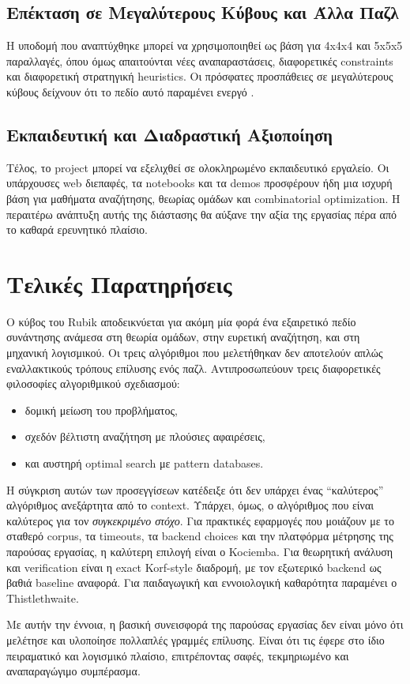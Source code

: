 \subsection{Επέκταση σε Μεγαλύτερους Κύβους και Άλλα Παζλ}

Η υποδομή που αναπτύχθηκε μπορεί να χρησιμοποιηθεί ως βάση για 4x4x4 και 5x5x5 παραλλαγές, όπου όμως απαιτούνται νέες αναπαραστάσεις, διαφορετικές constraints και διαφορετική στρατηγική heuristics. Οι πρόσφατες προσπάθειες σε μεγαλύτερους κύβους δείχνουν ότι το πεδίο αυτό παραμένει ενεργό \cite{khoruzhii2025ml}.

\subsection{Εκπαιδευτική και Διαδραστική Αξιοποίηση}

Τέλος, το project μπορεί να εξελιχθεί σε ολοκληρωμένο εκπαιδευτικό εργαλείο. Οι υπάρχουσες web διεπαφές, τα notebooks και τα demos προσφέρουν ήδη μια ισχυρή βάση για μαθήματα αναζήτησης, θεωρίας ομάδων και combinatorial optimization. Η περαιτέρω ανάπτυξη αυτής της διάστασης θα αύξανε την αξία της εργασίας πέρα από το καθαρά ερευνητικό πλαίσιο.

\section{Τελικές Παρατηρήσεις}

Ο κύβος του Rubik αποδεικνύεται για ακόμη μία φορά ένα εξαιρετικό πεδίο συνάντησης ανάμεσα στη θεωρία ομάδων, στην ευρετική αναζήτηση, και στη μηχανική λογισμικού. Οι τρεις αλγόριθμοι που μελετήθηκαν δεν αποτελούν απλώς εναλλακτικούς τρόπους επίλυσης ενός παζλ. Αντιπροσωπεύουν τρεις διαφορετικές φιλοσοφίες αλγοριθμικού σχεδιασμού:
\begin{itemize}
    \item δομική μείωση του προβλήματος,
    \item σχεδόν βέλτιστη αναζήτηση με πλούσιες αφαιρέσεις,
    \item και αυστηρή optimal search με pattern databases.
\end{itemize}

Η σύγκριση αυτών των προσεγγίσεων κατέδειξε ότι δεν υπάρχει ένας ``καλύτερος'' αλγόριθμος ανεξάρτητα από το context. Υπάρχει, όμως, ο αλγόριθμος που είναι καλύτερος για τον \emph{συγκεκριμένο στόχο}. Για πρακτικές εφαρμογές που μοιάζουν με το σταθερό corpus, τα timeouts, τα backend choices και την πλατφόρμα μέτρησης της παρούσας εργασίας, η καλύτερη επιλογή είναι ο Kociemba. Για θεωρητική ανάλυση και verification είναι η exact Korf-style διαδρομή, με τον εξωτερικό backend ως βαθιά baseline αναφορά. Για παιδαγωγική και εννοιολογική καθαρότητα παραμένει ο Thistlethwaite.

Με αυτήν την έννοια, η βασική συνεισφορά της παρούσας εργασίας δεν είναι μόνο
ότι μελέτησε και υλοποίησε πολλαπλές γραμμές επίλυσης. Είναι ότι τις έφερε
στο ίδιο πειραματικό και λογισμικό πλαίσιο, επιτρέποντας σαφές,
τεκμηριωμένο και αναπαραγώγιμο συμπέρασμα.
